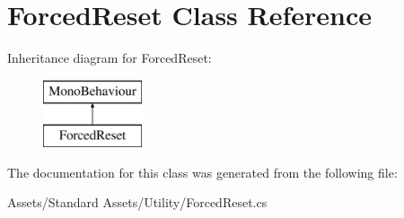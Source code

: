\hypertarget{class_forced_reset}{}\section{Forced\+Reset Class Reference}
\label{class_forced_reset}
Inheritance diagram for Forced\+Reset\+:\begin{figure}[H]
\begin{center}
\leavevmode
\includegraphics[height=2.000000cm]{class_forced_reset}
\end{center}
\end{figure}


The documentation for this class was generated from the following file\+:\begin{DoxyCompactItemize}
\item 
Assets/\+Standard Assets/\+Utility/Forced\+Reset.\+cs\end{DoxyCompactItemize}
